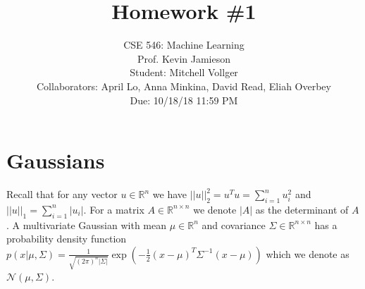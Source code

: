 \documentclass{article}
\date{{}}
\newcommand{\1}{\mathbf{1}}
\def\R{\mathbb{R}}
\begin{document}
\title{Homework \#1}
\author{\normalsize{CSE 546: Machine Learning}\\
\normalsize{Prof. Kevin Jamieson} \\
\normalsize{Student: Mitchell Vollger} \\
\normalsize{Collaborators: April Lo, Anna Minkina, David Read, Eliah Overbey} \\
\normalsize{Due: 10/18/18  11:59 PM}}
\maketitle


\section{Gaussians}
Recall that for any vector $u \in \R^n$ we have $||u||_2^2 = u^T u = \sum_{i=1}^n u_i^2$ and $||u||_1 = \sum_{i=1}^n |u_i|$. 
For a matrix $A \in \R^{n \times n}$ we denote $|A|$ as the determinant of $A$.
A multivariate Gaussian with mean $\mu \in \R^n$ and covariance $\Sigma \in \R^{n \times n}$ has a probability density function $p(x| \mu, \Sigma) =  \frac{1}{\sqrt{(2\pi)^n |\Sigma|}} \exp( -\frac{1}{2} (x-\mu)^T \Sigma^{-1} (x-\mu) )$ which we denote as $\mathcal{N}(\mu,\Sigma)$. \\
\end{document}
